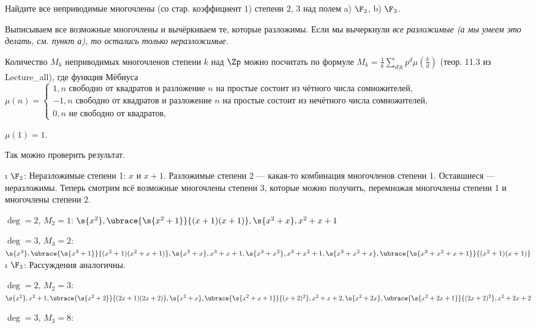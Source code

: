 \begin{problem}[44 (11.2)]
Найдите все неприводимые многочлены (со стар. коэффициент $1$) степени $2$, $3$ над полем a) $\F_2$, b) $\F_3$.
\end{problem}

\begin{solution}
Выписываем все возможные многочлены и вычёркиваем те, которые разложимы. Если мы вычеркнули \it{все} разложимые (а мы умеем это делать, см. пункт а), то остались только неразложимые. 

Количество $M_k$ неприводимых многочленов степени $k$ над $\Zp$ можно посчитать по формуле $M_k = \frac{1}{k} \sum\limits_{d|k} p^d \mu(\frac{k}{d})$ (теор. 11.3 из Lecture\_all), где функция Мёбиуса \\
$\mu(n) = 
	\begin{cases} 
		1, \text{$n$ свободно от квадратов и разложение $n$ на простые состоит из чётного числа сомножителей}, \\
		-1, \text{$n$ свободно от квадратов и разложение $n$ на простые состоит из нечётного числа сомножителей}, \\
		0, \text{$n$ не свободно от квадратов},
	\end{cases}$

$\mu(1) = 1$.

Так можно проверить результат.

\begin{enumerate}
\def\labelenumi{\alph{enumi})}
\i
  \(\F_2\):
  Неразложимые степени 1: $x$ и $x+1$. Разложимые степени 2 --- какая-то комбинация многочленов степени 1. Оставшиеся --- неразложимы. Теперь смотрим всё возможные многочлены степени 3, которые можно получить, перемножая многочлены степени 1 и многочлены степени 2.

  \(\deg=2\), $M_2=1$: \(\s{x^2}, \ubrace{\s{x^2+1}}{(x+1)(x+1)}, \s{x^2+x}, x^2+x+1\)

  \(\deg=3\), $M_3=2$: \(\s{x^3}, \ubrace{\s{x^3+1}}{(x^2+1)(x^2+x+1)}, \s{x^3+x}, x^3+x+1, \s{x^3+x^2}, x^3+x^2+1, \s{x^3+x^2+x}, \ubrace{\s{x^3+x^2+x+1}}{(x^2+1)(x+1)}\)
\i
  \(\F_3\):
  Рассуждения аналогичны.

  \(\deg=2\), $M_2=3$: \(\s{x^2}, x^2+1, \ubrace{\s{x^2+2}}{(2x+1)(2x+2)}, \s{x^2+x}, \ubrace{\s{x^2+x+1}}{(x+2)^2}, x^2+x+2, \s{x^2+2x}, \ubrace{\s{x^2+2x+1}}{(2x+2)^2}, x^2+2x+2\)

  \(\deg=3\), $M_3=8$: 
  

\end{enumerate}
\end{solution}
